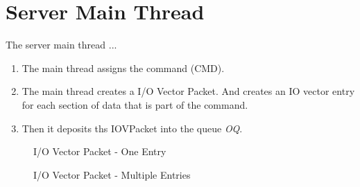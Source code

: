 \section{Server Main Thread}\label{sec:ServerMainThread}
The server main thread ...

\begin{enumerate}
\item The main thread assigns the command (CMD).
\item The main thread creates a I/O Vector Packet.
And creates an IO vector entry for each section of data that is part of the command.
\item Then it deposits ths IOVPacket into the queue \textit{OQ}.
\end{enumerate}

\begin{figure}
  \centering
  
  \caption{I/O Vector Packet - One Entry}
  \label{fig:IovPacket}
\end{figure}

\begin{figure}
  \centering
  
  \caption{I/O Vector Packet - Multiple Entries}
  \label{fig:IovPacket2}
\end{figure}

